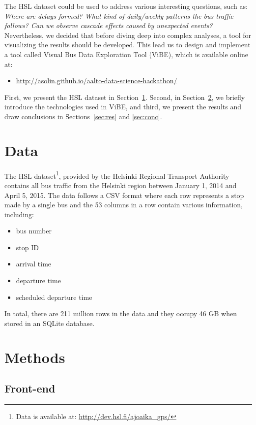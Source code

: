 \documentclass[a4paper,12pt]{article}
\begin{document}
The HSL dataset could be used to address various interesting questions, such 
as: \emph{Where are delays formed? What kind of daily/weekly patterns the bus 
traffic follows? Can we observe cascade effects caused by unexpected events?}
Nevertheless, we decided that before diving deep into complex 
analyses, a tool for visualizing the results should be developed. This lead us 
to design and implement a tool called Visual Bus Data Exploration Tool (ViBE), 
which is available online at:
\begin{itemize}
\item[] \url{http://asolin.github.io/aalto-data-science-hackathon/}
\end{itemize}

First, we present the HSL dataset in Section~\ref{sec:data}. Second, in 
Section~\ref{sec:methods}, we briefly introduce the technologies used in ViBE, 
and third, we present the results and draw conclusions in 
Sections~\ref{sec:res} and \ref{sec:conc}.

\section{Data} \label{sec:data}

The HSL dataset\footnote{Data is available at: 
\url{http://dev.hsl.fi/ajoaika_gps/}}, provided by the Helsinki Regional 
Transport Authority contains all bus traffic from the Helsinki region between 
January 1, 2014 and April 5, 2015. The data follows a CSV format where each row 
represents a stop made by a single bus and the 53 columns in a row contain 
various information, including:
\begin{itemize}
\item bus number
\item stop ID
\item arrival time
\item departure time
\item scheduled departure time
\end{itemize}
In total, there are 211 million rows in the data and they occupy 46 GB 
when stored in an SQLite database.

\section{Methods} \label{sec:methods}

\subsection{Front-end}
\end{document}

